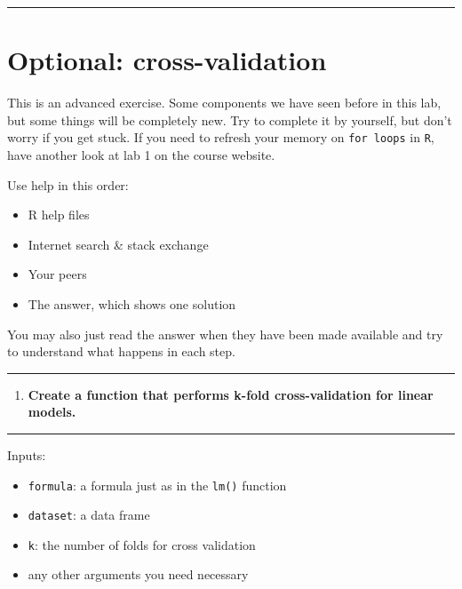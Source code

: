 \documentclass[
  12pt,
]{article}
\providecommand{\tightlist}{%
  \setlength{\itemsep}{0pt}\setlength{\parskip}{0pt}}
\begin{document}
\begin{center}\rule{0.5\linewidth}{0.5pt}\end{center}

\hypertarget{optional-cross-validation}{%
\section{Optional: cross-validation}\label{optional-cross-validation}}

This is an advanced exercise. Some components we have seen before in
this lab, but some things will be completely new. Try to complete it by
yourself, but don't worry if you get stuck. If you need to refresh your
memory on \texttt{for\ loops} in \texttt{R}, have another look at lab 1
on the course website.

Use help in this order:

\begin{itemize}
\tightlist
\item
  R help files
\item
  Internet search \& stack exchange
\item
  Your peers
\item
  The answer, which shows one solution
\end{itemize}

You may also just read the answer when they have been made available and
try to understand what happens in each step.

\begin{center}\rule{0.5\linewidth}{0.5pt}\end{center}

\begin{enumerate}
\def\labelenumi{\arabic{enumi}.}
\setcounter{enumi}{17}
\tightlist
\item
  \textbf{Create a function that performs k-fold cross-validation for
  linear models.}
\end{enumerate}

\begin{center}\rule{0.5\linewidth}{0.5pt}\end{center}

Inputs:

\begin{itemize}
\tightlist
\item
  \texttt{formula}: a formula just as in the \texttt{lm()} function
\item
  \texttt{dataset}: a data frame
\item
  \texttt{k}: the number of folds for cross validation
\item
  any other arguments you need necessary
\end{itemize}
\end{document}
